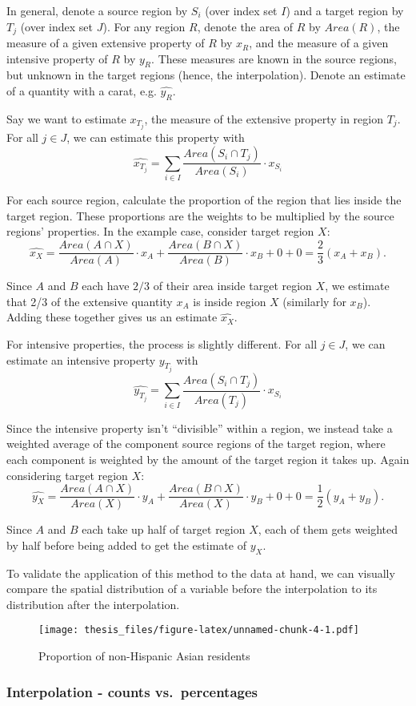 \documentclass[12pt,twoside]{reedthesis}
\theoremstyle{definition}
\theoremstyle{definition}
\theoremstyle{definition}
\theoremstyle{remark}
\begin{document}
In general, denote a source region by \(S_i\) (over index set \(I\)) and
a target region by \(T_j\) (over index set \(J\)). For any region \(R\),
denote the area of \(R\) by \(Area(R)\), the measure of a given
extensive property of \(R\) by \(x_R\), and the measure of a given
intensive property of \(R\) by \(y_R\). These measures are known in the
source regions, but unknown in the target regions (hence, the
interpolation). Denote an estimate of a quantity with a carat, e.g.
\(\widehat{y_{R}}\).

Say we want to estimate \(x_{T_j}\), the measure of the extensive
property in region \(T_j\). For all \(j \in J\), we can estimate this
property with \[
\widehat{x_{T_j}} = \sum_{i \in I} \frac{Area(S_i \cap T_j)}{Area(S_i)} \cdot x_{S_i}
\]

For each source region, calculate the proportion of the region that lies
inside the target region. These proportions are the weights to be
multiplied by the source regions' properties. In the example case,
consider target region \(X\): \[
\widehat{x_X} = \frac{Area(A \cap X)}{Area(A)} \cdot x_{A} + \frac{Area(B \cap X)}{Area(B)} \cdot x_{B} + 0 + 0 = \frac{2}{3}(x_A + x_B).
\]

Since \(A\) and \(B\) each have \(2/3\) of their area inside target
region \(X\), we estimate that 2/3 of the extensive quantity \(x_A\) is
inside region \(X\) (similarly for \(x_B\)). Adding these together gives
us an estimate \(\widehat{x_X}\).

For intensive properties, the process is slightly different. For all
\(j \in J\), we can estimate an intensive property \(y_{T_j}\) with \[
\widehat{y_{T_j}} = \sum_{i \in I} \frac{Area(S_i \cap T_j)}{Area(T_j)} \cdot x_{S_i}
\]

Since the intensive property isn't ``divisible'' within a region, we
instead take a weighted average of the component source regions of the
target region, where each component is weighted by the amount of the
target region it takes up. Again considering target region \(X\): \[
\widehat{y_X} = \frac{Area(A \cap X)}{Area(X)} \cdot y_{A} + \frac{Area(B \cap X)}{Area(X)} \cdot y_{B} + 0 + 0 = \frac{1}{2}(y_A + y_B).
\]

Since \(A\) and \(B\) each take up half of target region \(X\), each of
them gets weighted by half before being added to get the estimate of
\(y_X\).

To validate the application of this method to the data at hand, we can
visually compare the spatial distribution of a variable before the
interpolation to its distribution after the interpolation.
\begin{figure}
\centering
\texttt{[image: thesis\_files/figure-latex/unnamed-chunk-4-1.pdf]}
\caption{\label{fig:unnamed-chunk-4}Proportion of non-Hispanic Asian
residents}
\end{figure}
\hypertarget{interpolation---counts-vs.percentages}{%
\subsubsection{Interpolation - counts
vs.~percentages}\label{interpolation---counts-vs.percentages}}
\end{document}
